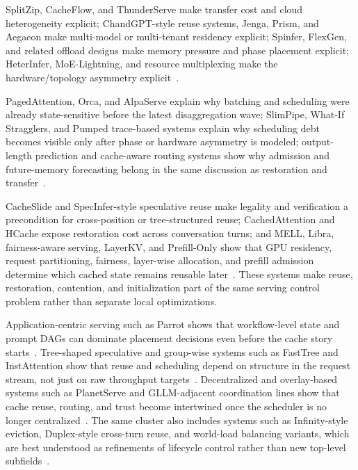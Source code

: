 SplitZip, CacheFlow, and ThunderServe make transfer cost and cloud heterogeneity explicit; ChandGPT-style reuse systems, Jenga, Prism, and Aegaeon make multi-model or multi-tenant residency explicit; Spinfer, FlexGen, and related offload designs make memory pressure and phase placement explicit; HeterInfer, MoE-Lightning, and resource multiplexing make the hardware/topology asymmetry explicit~\cite{guo2026splitzip,nian2026cacheflow,jiang2025thunderserve,gao2025weaver,zhang2025jenga,yu2025prism,fan2025spinfer,sheng2023flexgen,chen2025heteroinfer,cao2025moelightning,he2025resourcemultiplexing}.

PagedAttention, Orca, and AlpaServe explain why batching and scheduling were already state-sensitive before the latest disaggregation wave; SlimPipe, What-If Stragglers, and Pumped trace-based systems explain why scheduling debt becomes visible only after phase or hardware asymmetry is modeled; output-length prediction and cache-aware routing systems show why admission and future-memory forecasting belong in the same discussion as restoration and transfer~\cite{kwon2023pagedattention,yu2022orca,li2023alpaserve,liu2025slimpipe,lin2025whatifstragglers,gong2025pastfuture,jiang2025shadowviews}.

CacheSlide and SpecInfer-style speculative reuse make legality and verification a precondition for cross-position or tree-structured reuse; CachedAttention and HCache expose restoration cost across conversation turns; and MELL, Libra, fairness-aware serving, LayerKV, and Prefill-Only show that GPU residency, request partitioning, fairness, layer-wise allocation, and prefill admission determine which cached state remains reusable later~\cite{cacheslide2025,miao2024specinfer,gao2025cachedattention,gao2025hcache,liu2025mell,ruan2026libra,sheng2024fairnessserving,xiong2024layerkv,du2025prefillonly}. These systems make reuse, restoration, contention, and initialization part of the same serving control problem rather than separate local optimizations.

Application-centric serving such as Parrot shows that workflow-level state and prompt DAGs can dominate placement decisions even before the cache story starts~\cite{lin2024parrot}. Tree-shaped speculative and group-wise systems such as FastTree and InstAttention show that reuse and scheduling depend on structure in the request stream, not just on raw throughput targets~\cite{pan2025fasttree,pan2025instattention}. Decentralized and overlay-based systems such as PlanetServe and GLLM-adjacent coordination lines show that cache reuse, routing, and trust become intertwined once the scheduler is no longer centralized~\cite{fang2026planetserve}. The same cluster also includes systems such as Infinity-style eviction, Duplex-style cross-turn reuse, and world-load balancing variants, which are best understood as refinements of lifecycle control rather than new top-level subfields~\cite{infinigen2024,yun2024duplex,wang2025wlbllm}.

